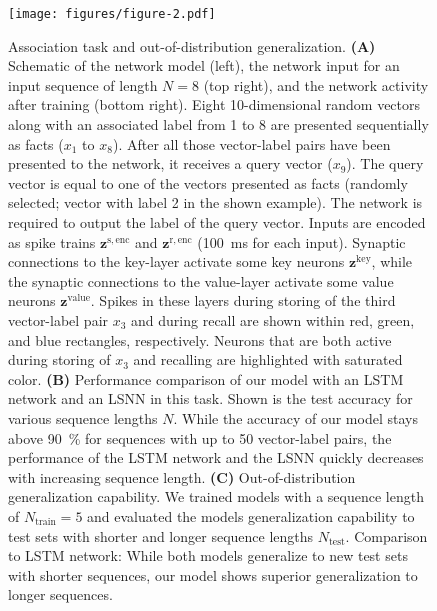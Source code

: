 \documentclass{article}
\newcommand{\vm}[1]{\bm{#1}}
\begin{document}
\begin{figure}\centering
\texttt{[image: figures/figure-2.pdf]}
\caption{Association task and out-of-distribution generalization.
\textbf{(A)} Schematic of the network model (left), the network input for an input sequence of length $N=8$ (top right), and the network activity after training (bottom right).
Eight \num{10}-dimensional random vectors along with an associated label from \num{1} to \num{8} are presented sequentially as facts ($x_1$ to $x_8$). After all those vector-label pairs have been presented to the network, it receives a query vector ($x_9$). The query vector is equal to one of the vectors presented as facts (randomly selected; vector with label \num{2} in the shown example). The network is required to output the label of the query vector. Inputs are encoded as spike trains $\vm{z}^\mathrm{s,enc}$ and $\vm{z}^\mathrm{r,enc}$ (\SI{100}{ms} for each input). Synaptic connections to the key-layer activate some key neurons $\vm{z}^{\mathrm{key}}$, while the synaptic connections to the value-layer activate some value neurons $\vm{z}^{\mathrm{value}}$. Spikes in these layers during storing of the third vector-label pair $x_3$ and during recall are shown within red, green, and blue rectangles, respectively. Neurons that are both active during storing of $x_3$ and recalling are highlighted with saturated color.
\textbf{(B)} Performance comparison of our model with an LSTM network and an LSNN in this task. Shown is the test accuracy for various sequence lengths $N$. While the accuracy of our model stays above \SI{90}{\percent} for sequences with up to \num{50} vector-label pairs, the performance of the LSTM network and the LSNN quickly decreases with increasing sequence length.
\textbf{(C)} Out-of-distribution generalization capability. We trained models with a sequence length of $N_\mathrm{train}=5$ and evaluated the models generalization capability to test sets with shorter and longer sequence lengths $N_\mathrm{test}$. Comparison to LSTM network: While both models generalize to new test sets with shorter sequences, our model shows superior generalization to longer sequences.
}
\label{fig:fig2}
\end{figure}
\end{document}
